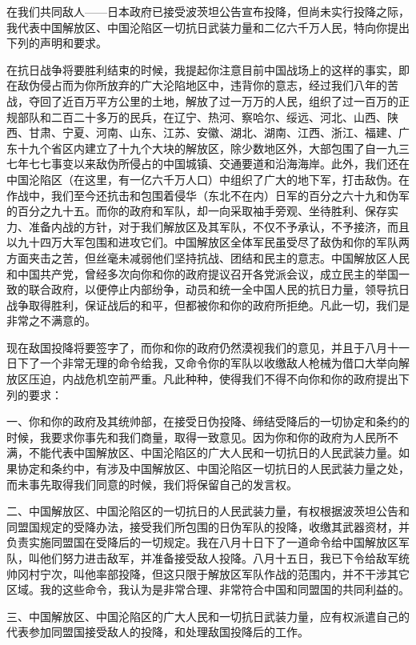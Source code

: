 在我们共同敌人——日本政府已接受波茨坦公告宣布投降，但尚未实行投降之际，我代表中国解放区、中国沦陷区一切抗日武装力量和二亿六千万人民，特向你提出下列的声明和要求。

在抗日战争将要胜利结束的时候，我提起你注意目前中国战场上的这样的事实，即在敌伪侵占而为你所放弃的广大沦陷地区中，违背你的意志，经过我们八年的苦战，夺回了近百万平方公里的土地，解放了过一万万的人民，组织了过一百万的正规部队和二百二十多万的民兵，在辽宁、热河、察哈尔、绥远、河北、山西、陕西、甘肃、宁夏、河南、山东、江苏、安徽、湖北、湖南、江西、浙江、福建、广东十九个省区内建立了十九个大块的解放区，除少数地区外，大部包围了自一九三七年七七事变以来敌伪所侵占的中国城镇、交通要道和沿海海岸。此外，我们还在中国沦陷区（在这里，有一亿六千万人口）中组织了广大的地下军，打击敌伪。在作战中，我们至今还抗击和包围着侵华（东北不在内）日军的百分之六十九和伪军的百分之九十五。而你的政府和军队，却一向采取袖手旁观、坐待胜利、保存实力、准备内战的方针，对于我们解放区及其军队，不仅不予承认，不予接济，而且以九十四万大军包围和进攻它们。中国解放区全体军民虽受尽了敌伪和你的军队两方面夹击之苦，但丝毫未减弱他们坚持抗战、团结和民主的意志。中国解放区人民和中国共产党，曾经多次向你和你的政府提议召开各党派会议，成立民主的举国一致的联合政府，以便停止内部纷争，动员和统一全中国人民的抗日力量，领导抗日战争取得胜利，保证战后的和平，但都被你和你的政府所拒绝。凡此一切，我们是非常之不满意的。

现在敌国投降将要签字了，而你和你的政府仍然漠视我们的意见，并且于八月十一日下了一个非常无理的命令给我，又命令你的军队以收缴敌人枪械为借口大举向解放区压迫，内战危机空前严重。凡此种种，使得我们不得不向你和你的政府提出下列的要求：

一、你和你的政府及其统帅部，在接受日伪投降、缔结受降后的一切协定和条约的时候，我要求你事先和我们商量，取得一致意见。因为你和你的政府为人民所不满，不能代表中国解放区、中国沦陷区的广大人民和一切抗日的人民武装力量。如果协定和条约中，有涉及中国解放区、中国沦陷区一切抗日的人民武装力量之处，而未事先取得我们同意的时候，我们将保留自己的发言权。

二、中国解放区、中国沦陷区的一切抗日的人民武装力量，有权根据波茨坦公告和同盟国规定的受降办法，接受我们所包围的日伪军队的投降，收缴其武器资材，并负责实施同盟国在受降后的一切规定。我在八月十日下了一道命令给中国解放区军队，叫他们努力进击敌军，并准备接受敌人投降。八月十五日，我已下令给敌军统帅冈村宁次，叫他率部投降，但这只限于解放区军队作战的范围内，并不干涉其它区域。我的这些命令，我认为是非常合理、非常符合中国和同盟国的共同利益的。

三、中国解放区、中国沦陷区的广大人民和一切抗日武装力量，应有权派遣自己的代表参加同盟国接受敌人的投降，和处理敌国投降后的工作。

